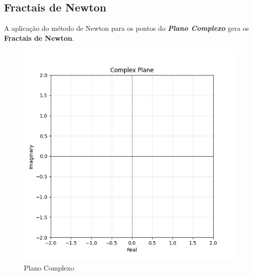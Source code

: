 \subsection{Fractais de Newton}
A aplicação do método de Newton para os pontos do \textit{\textbf{Plano Complexo}} gera os \textbf{Fractais de Newton}.
\begin{figure}[H]
    \centering
    \includegraphics[width=1\textwidth]{Imagens/complexPlane/complex_plane_axes.png}
    \caption{Plano Complexo}
    \label{fig:complexPlane}
\end{figure}
